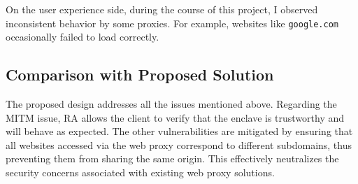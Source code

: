 On the user experience side, during the course of this project, I observed inconsistent behavior by some proxies. For example, websites like \texttt{google.com} occasionally failed to load correctly.

\subsection{Comparison with Proposed Solution}
The proposed design addresses all the issues mentioned above. Regarding the MITM issue, RA allows the client to verify that the enclave is trustworthy and will behave as expected. The other vulnerabilities are mitigated by ensuring that all websites accessed via the web proxy correspond to different subdomains, thus preventing them from sharing the same origin. This effectively neutralizes the security concerns associated with existing web proxy solutions.